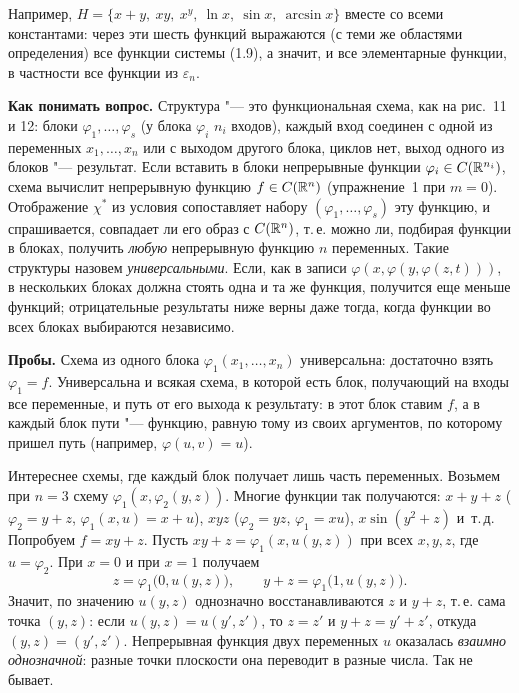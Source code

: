 \begin{solution}[4 (\S\,5)]
\answer Например, $H=\{x+y,\ xy,\ x^y,\ \ln x,\ \sin x,\ \arcsin x\}$ вместе
со всеми константами: через эти шесть функций выражаются (с теми же
областями определения) все функции системы (1.9), а значит, и все
элементарные функции, в частности все функции из $\varepsilon_n$.
\end{solution}

\begin{solution}[5 (\S\,5)]
\textbf{Как понимать вопрос.} Структура "--- это функциональная схема, как
на рис.~11 и 12: блоки $\varphi_1,\dots,\varphi_s$ (у блока $\varphi_i$
$n_i$ входов), каждый вход соединен с одной из переменных $x_1,\dots,x_n$ или
с выходом другого блока, циклов нет, выход одного из блоков "--- результат.
Если вставить в блоки непрерывные функции $\varphi_i\in C(\mathbb R^{n_i})$, схема
вычислит непрерывную функцию $f\in C(\mathbb R^n)$ (упражнение~1 при $m=0$).
Отображение $\chi^*$ из условия сопоставляет набору $(\varphi_1,\dots,\varphi_s)$
эту функцию, и спрашивается, совпадает ли его образ с $C(\mathbb R^n)$, т.\,е.
можно ли, подбирая функции в блоках, получить \emph{любую} непрерывную функцию
$n$ переменных. Такие структуры назовем \emph{универсальными}. Если, как
в записи $\varphi(x,\varphi(y,\varphi(z,t)))$, в нескольких блоках должна стоять
одна и та же функция, получится еще меньше функций; отрицательные результаты
ниже верны даже тогда, когда функции во всех блоках выбираются независимо.

\textbf{Пробы.} Схема из одного блока $\varphi_1(x_1,\dots,x_n)$ универсальна:
достаточно взять $\varphi_1=f$. Универсальна и всякая схема, в которой есть
блок, получающий на входы все переменные, и путь от его выхода к результату:
в этот блок ставим $f$, а в каждый блок пути "--- функцию, равную тому из
своих аргументов, по которому пришел путь (например, $\varphi(u,v)=u$).

Интереснее схемы, где каждый блок получает лишь часть переменных. Возьмем
при $n=3$ схему $\varphi_1(x,\varphi_2(y,z))$. Многие функции так получаются:
$x+y+z$ ($\varphi_2=y+z$, $\varphi_1(x,u)=x+u$), $xyz$ ($\varphi_2=yz$,
$\varphi_1=xu$), $x\sin(y^2+z)$ и~т.\,д. Попробуем $f=xy+z$. Пусть
$xy+z=\varphi_1(x,u(y,z))$ при всех $x,y,z$, где $u=\varphi_2$. При $x=0$
и при $x=1$ получаем
\[
z=\varphi_1\bigl(0,u(y,z)\bigr),\qquad y+z=\varphi_1\bigl(1,u(y,z)\bigr).
\]
Значит, по значению $u(y,z)$ однозначно восстанавливаются $z$ и $y+z$, т.\,е.
сама точка $(y,z)$: если $u(y,z)=u(y',z')$, то $z=z'$ и $y+z=y'+z'$, откуда
$(y,z)=(y',z')$. Непрерывная функция двух переменных $u$ оказалась
\emph{взаимно однозначной}: разные точки плоскости она переводит в разные
числа. Так не бывает.


\end{solution}
